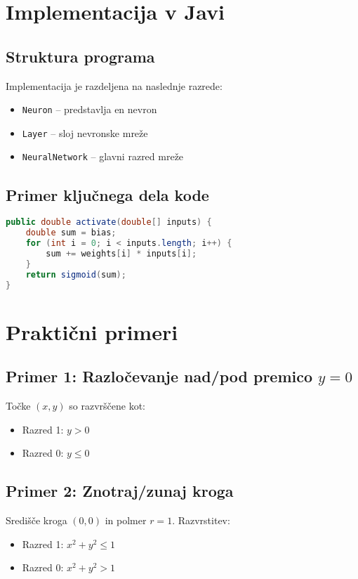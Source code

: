\documentclass[12pt,a4paper]{article}
\begin{document}
\section{Implementacija v Javi}
\subsection{Struktura programa}
Implementacija je razdeljena na naslednje razrede:
\begin{itemize}
    \item \texttt{Neuron} – predstavlja en nevron
    \item \texttt{Layer} – sloj nevronske mreže
    \item \texttt{NeuralNetwork} – glavni razred mreže
\end{itemize}

\subsection{Primer ključnega dela kode}
\begin{lstlisting}[language=Java, caption=Izračun izhoda nevrona]
public double activate(double[] inputs) {
    double sum = bias;
    for (int i = 0; i < inputs.length; i++) {
        sum += weights[i] * inputs[i];
    }
    return sigmoid(sum);
}
\end{lstlisting}

\section{Praktični primeri}
\subsection{Primer 1: Razločevanje nad/pod premico $y = 0$}
Točke $(x, y)$ so razvrščene kot:
\begin{itemize}
    \item Razred 1: $y > 0$
    \item Razred 0: $y \leq 0$
\end{itemize}

\subsection{Primer 2: Znotraj/zunaj kroga}
Središče kroga $(0,0)$ in polmer $r = 1$. Razvrstitev:
\begin{itemize}
    \item Razred 1: $x^2 + y^2 \leq 1$
    \item Razred 0: $x^2 + y^2 > 1$
\end{itemize}
\end{document}
